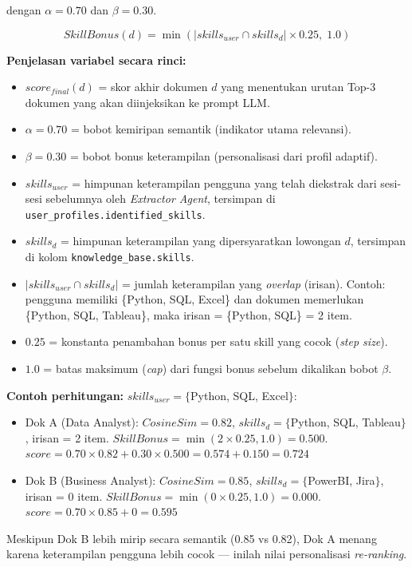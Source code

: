 \noindent dengan $\alpha = 0.70$ dan $\beta = 0.30$.

\begin{equation}
  SkillBonus(d) = \min(|skills_{user} \cap skills_d| \times 0.25,\; 1.0)
  \label{eq:skillbonus}
\end{equation}

\noindent \textbf{Penjelasan variabel secara rinci:}
\begin{itemize}
  \item $score_{final}(d)$ = skor akhir dokumen $d$ yang menentukan urutan Top-3
    dokumen yang akan diinjeksikan ke prompt LLM.
  \item $\alpha = 0.70$ = bobot kemiripan semantik (indikator utama relevansi).
  \item $\beta = 0.30$ = bobot bonus keterampilan (personalisasi dari profil adaptif).
  \item $skills_{user}$ = himpunan keterampilan pengguna yang telah diekstrak dari
    sesi-sesi sebelumnya oleh \textit{Extractor Agent}, tersimpan di
    \texttt{user\_profiles.identified\_skills}.
  \item $skills_d$ = himpunan keterampilan yang dipersyaratkan lowongan $d$,
    tersimpan di kolom \texttt{knowledge\_base.skills}.
  \item $|skills_{user} \cap skills_d|$ = jumlah keterampilan yang \textit{overlap}
    (irisan). Contoh: pengguna memiliki \{Python, SQL, Excel\} dan dokumen memerlukan
    \{Python, SQL, Tableau\}, maka irisan = \{Python, SQL\} = 2 item.
  \item $0.25$ = konstanta penambahan bonus per satu skill yang cocok (\textit{step size}).
  \item $1.0$ = batas maksimum (\textit{cap}) dari fungsi bonus sebelum dikalikan bobot $\beta$.
\end{itemize}

\textbf{Contoh perhitungan:} $skills_{user} = \{$Python, SQL, Excel$\}$:
\begin{itemize}[noitemsep]
  \item Dok A (Data Analyst): $CosineSim = 0.82$, $skills_d = \{$Python, SQL, Tableau$\}$, irisan = 2 item.
    $SkillBonus = \min(2 \times 0.25, 1.0) = 0.500$.
    $score = 0.70 \times 0.82 + 0.30 \times 0.500 = 0.574 + 0.150 = \mathbf{0.724}$
  \item Dok B (Business Analyst): $CosineSim = 0.85$, $skills_d = \{$PowerBI, Jira$\}$, irisan = 0 item.
    $SkillBonus = \min(0 \times 0.25, 1.0) = 0.000$.
    $score = 0.70 \times 0.85 + 0 = \mathbf{0.595}$
\end{itemize}
Meskipun Dok B lebih mirip secara semantik (0.85 vs 0.82), Dok A menang karena
keterampilan pengguna lebih cocok --- inilah nilai personalisasi \textit{re-ranking}.

